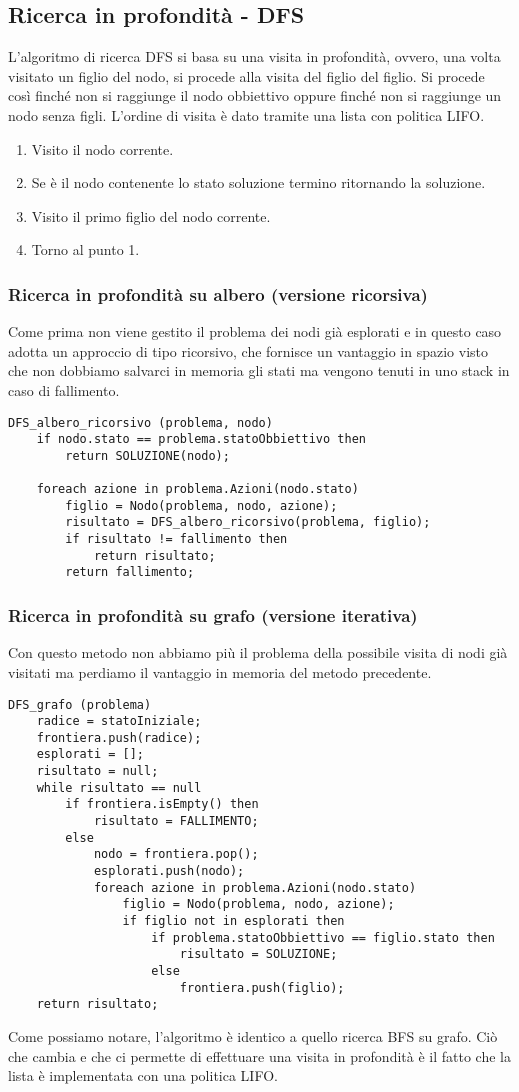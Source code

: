 \subsection{Ricerca in profondit\`a - DFS}
L'algoritmo di ricerca DFS si basa su una visita in profondit\`a, ovvero, una volta visitato
un figlio del nodo, si procede alla visita del figlio del figlio. Si procede cos\`i finch\'e
non si raggiunge il nodo obbiettivo oppure finch\'e non si raggiunge un nodo senza figli.
L'ordine di visita \`e dato  tramite una lista con politica LIFO.
\begin{enumerate}
	\item Visito il nodo corrente.
	\item Se \`e il nodo contenente lo stato soluzione termino ritornando la soluzione.
	\item Visito il primo figlio del nodo corrente.
	\item Torno al punto 1.
\end{enumerate}

\subsubsection{Ricerca in profondit\`a su albero (versione ricorsiva)}
Come prima non viene gestito il problema dei nodi gi\`a esplorati e in questo caso adotta un
approccio di tipo ricorsivo, che fornisce un vantaggio in spazio visto che non dobbiamo
salvarci in memoria gli stati ma vengono tenuti in uno stack in caso di fallimento.
\begin{lstlisting}[style=pseudo-style]
DFS_albero_ricorsivo (problema, nodo)
	if nodo.stato == problema.statoObbiettivo then
		return SOLUZIONE(nodo);
	
	foreach azione in problema.Azioni(nodo.stato)
		figlio = Nodo(problema, nodo, azione);
		risultato = DFS_albero_ricorsivo(problema, figlio);
		if risultato != fallimento then
			return risultato;
		return fallimento;
\end{lstlisting}

\subsubsection{Ricerca in profondit\`a su grafo (versione iterativa)}
Con questo metodo non abbiamo pi\`u il problema della possibile visita di nodi gi\`a visitati
ma perdiamo il vantaggio in memoria del metodo precedente.
\begin{lstlisting}[style=pseudo-style]
DFS_grafo (problema)
	radice = statoIniziale;
	frontiera.push(radice);
	esplorati = [];
	risultato = null;
	while risultato == null
		if frontiera.isEmpty() then
			risultato = FALLIMENTO;
		else
			nodo = frontiera.pop();
			esplorati.push(nodo);
			foreach azione in problema.Azioni(nodo.stato)
				figlio = Nodo(problema, nodo, azione);
				if figlio not in esplorati then
					if problema.statoObbiettivo == figlio.stato then
						risultato = SOLUZIONE;
					else
						frontiera.push(figlio);
	return risultato;	
\end{lstlisting}
Come possiamo notare, l'algoritmo \`e identico a quello ricerca BFS su grafo. Ci\`o che cambia
e che ci permette di effettuare una visita in profondit\`a \`e il fatto che la lista \`e
implementata con una politica LIFO.

